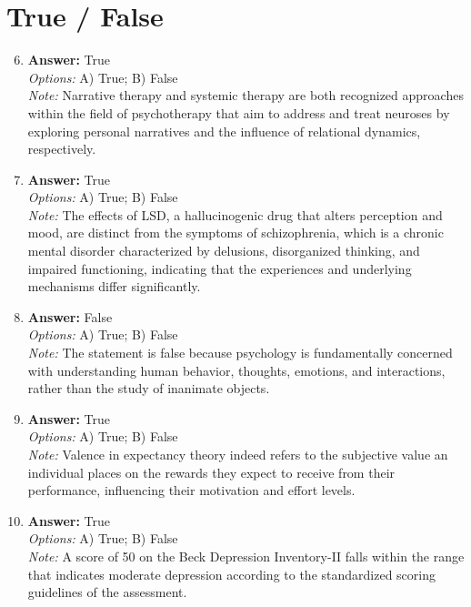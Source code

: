 \documentclass[12pt]{article}
\begin{document}
\section*{True / False}
\begin{enumerate}[label=\arabic*.]
\setcounter{enumi}{5}
\item \textbf{Answer:} True
\\ \textit{Options:} A) True; B) False
\\ \textit{Note:} Narrative therapy and systemic therapy are both recognized approaches within the field of psychotherapy that aim to address and treat neuroses by exploring personal narratives and the influence of relational dynamics, respectively.
\item \textbf{Answer:} True
\\ \textit{Options:} A) True; B) False
\\ \textit{Note:} The effects of LSD, a hallucinogenic drug that alters perception and mood, are distinct from the symptoms of schizophrenia, which is a chronic mental disorder characterized by delusions, disorganized thinking, and impaired functioning, indicating that the experiences and underlying mechanisms differ significantly.
\item \textbf{Answer:} False
\\ \textit{Options:} A) True; B) False
\\ \textit{Note:} The statement is false because psychology is fundamentally concerned with understanding human behavior, thoughts, emotions, and interactions, rather than the study of inanimate objects.
\item \textbf{Answer:} True
\\ \textit{Options:} A) True; B) False
\\ \textit{Note:} Valence in expectancy theory indeed refers to the subjective value an individual places on the rewards they expect to receive from their performance, influencing their motivation and effort levels.
\item \textbf{Answer:} True
\\ \textit{Options:} A) True; B) False
\\ \textit{Note:} A score of 50 on the Beck Depression Inventory-II falls within the range that indicates moderate depression according to the standardized scoring guidelines of the assessment.
\end{enumerate}
\end{document}
